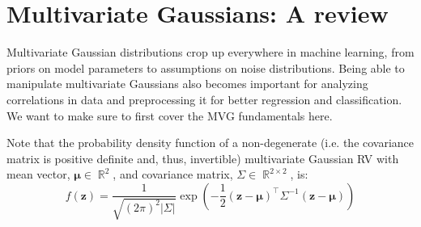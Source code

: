 \documentclass{article}
\newcommand{\abs}[1]{\left|#1\right|}
\renewcommand{\vec}[1]{\boldsymbol{\mathbf{#1}}}
\newcommand{\Question}[1]{\Large \section{ #1 } \normalsize}
\DeclareMathOperator{\R}{\mathbb{R}}
\begin{document}
\fontsize{12}{15}\selectfont

\Question{Multivariate Gaussians: A review}

Multivariate Gaussian distributions crop up everywhere in machine learning, from priors on model parameters to assumptions on noise distributions. 
Being able to manipulate multivariate Gaussians also becomes important for analyzing correlations in data and preprocessing it for better regression and classification. 
We want to make sure to first cover the MVG fundamentals here.

Note that the probability density function of a non-degenerate (i.e. the covariance matrix is positive definite and, thus, invertible) multivariate Gaussian RV with mean vector, $\vec{\mu} \in \R^2$, and covariance matrix, $\Sigma \in \R^{2 \times 2}$, is: 
\[f(\vec{z}) = \frac{1}{\sqrt{(2\pi)^2 \abs{\Sigma}}} \exp\left(-\frac{1}{2}(\vec{z} - \vec{\mu})^\top \Sigma^{-1} (\vec{z} - \vec{\mu})\right)\]
\end{document}
